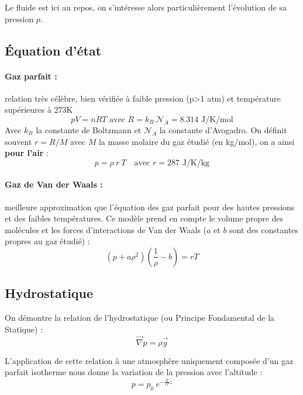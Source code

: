 
Le fluide est ici au repos, on s'intéresse alors particulièrement l'évolution de sa pression $p$.


\subsection{Équation d'état}
\paragraph{Gaz parfait :}relation très célèbre, bien vérifiée à faible pression (p>1 atm) et température supérieures à 273K
%
\begin{equation}
pV = nRT \text{ avec } R = k_B~\mathcal{N}_A = 8.314 \text{ J/K/mol}
\end{equation}
%
Avec $k_B$ la constante de Boltzmann et $\mathcal{N}_A$ la constante d'Avogadro. On définit souvent $r = R/M$ avec $M$ la masse molaire du gaz étudié (en kg/mol), on a ainsi \textbf{pour l'air} :
%
\begin{equation}
p = \rho~r~T \quad\text{avec } r = 287 \text{ J/K/kg}
\end{equation}

\paragraph{Gaz de Van der Waals :}meilleure approximation que l'équation des gaz parfait pour des hautes pressions et des faibles températures. Ce modèle prend en compte le volume propre des molécules et les forces d'interactions de Van der Waals ($a$ et $b$ sont des constantes propres au gaz étudié) :
%
\begin{equation}
\left( p + a\rho^2 \right) \left( \frac{1}{\rho} - b \right) = rT
\end{equation}


\subsection{Hydrostatique}
On démontre la relation de l'hydrostatique (ou Principe Fondamental de la Statique) :
%
\begin{equation}
\vec{\nabla} p = \rho \vec{g}
\label{eq:PFS}
\end{equation}

L'application de cette relation à une atmosphère uniquement composée d'un gaz parfait isotherme nous donne la variation de la pression avec l'altitude :
%
\begin{equation}
p = p_0~e^{-\frac{g}{rT}z}
\end{equation}

